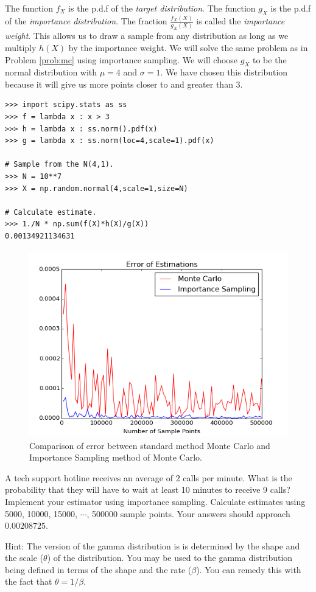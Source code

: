 The function $f_X$ is the p.d.f of the \emph{target distribution}. The function $g_X$ is the p.d.f of the \emph{importance distribution}. The fraction $\frac{f_X(X)}{g_X(X)}$ is called the \emph{importance weight}. This allows us to draw a sample from any distribution as long as we multiply $h(X)$ by the importance weight. We will solve the same problem as in Problem \ref{prob:mc} using importance sampling. We will choose $g_X$ to be the normal distribution with $\mu = 4$ and $\sigma = 1$. We have chosen this distribution because it will give us more points closer to and greater than 3.

\begin{lstlisting}
>>> import scipy.stats as ss
>>> f = lambda x : x > 3
>>> h = lambda x : ss.norm().pdf(x)
>>> g = lambda x : ss.norm(loc=4,scale=1).pdf(x)

# Sample from the N(4,1).
>>> N = 10**7
>>> X = np.random.normal(4,scale=1,size=N)

# Calculate estimate.
>>> 1./N * np.sum(f(X)*h(X)/g(X))
0.00134921134631
\end{lstlisting}

\begin{figure}[H]
\includegraphics[width=\textwidth]{MCvsIS.png}
\caption{Comparison of error between standard method Monte Carlo and Importance Sampling method of Monte Carlo.}
\label{fig:compare}
\end{figure}

\begin{problem} \label{prob:gamma}
A tech support hotline receives an average of 2 calls per minute. What is the probability that they will have to wait at least 10 minutes to receive 9 calls? Implement your estimator using importance sampling. Calculate estimates using 5000, 10000, 15000, $\cdots$, 500000 sample points. Your answers should approach $0.00208725$.

Hint: The version of the gamma distribution is  is determined by the shape and the scale ($\theta$) of the distribution. You may be used to the gamma distribution being defined in terms of the shape and the rate ($\beta$). You can remedy this with the fact that $\theta = 1/\beta$.
\end{problem}

